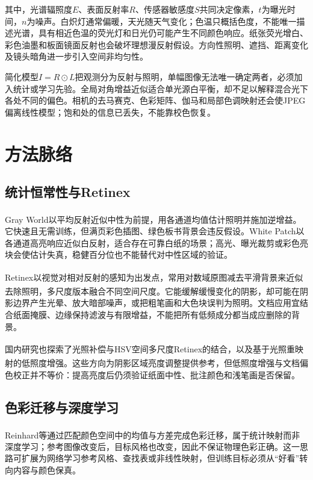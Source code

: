 \documentclass[UTF8,a4paper,zihao=5,fontset=none]{ctexart}
\begin{document}
其中，光谱辐照度$E$、表面反射率$R$、传感器敏感度$S$共同决定像素，$t$为曝光时间，$n$为噪声。白炽灯通常偏暖，天光随天气变化；色温只概括色度，不能唯一描述光谱，具有相近色温的荧光灯和日光仍可能产生不同颜色响应。纸张荧光增白、彩色油墨和板面镜面反射也会破坏理想漫反射假设。方向性照明、遮挡、距离变化及镜头暗角进一步引入空间非均匀性。


简化模型$I=R\odot L$把观测分为反射与照明，单幅图像无法唯一确定两者，必须加入统计或学习先验。全局对角增益近似适合单光源白平衡，却不足以解释混合光下各处不同的偏色。相机的去马赛克、色彩矩阵、伽马和局部色调映射还会使JPEG偏离线性模型；饱和处的信息已丢失，不能靠校色恢复。


\section{方法脉络}

\subsection{统计恒常性与Retinex}

Gray World以平均反射近似中性为前提，用各通道均值估计照明并施加逆增益\textsuperscript{\cite{buchsbaum1980}}。它快速且无需训练，但满页彩色插图、绿色板书背景会违反假设。White Patch以各通道高亮响应近似白反射，适合存在可靠白纸的场景；高光、曝光裁剪或彩色亮块会使估计失真，稳健百分位也不能替代对中性区域的验证。


Retinex以视觉对相对反射的感知为出发点\textsuperscript{\cite{land1971}}，常用对数域原图减去平滑背景来近似去除照明，多尺度版本融合不同空间尺度\textsuperscript{\cite{jobson1997}}。它能缓解缓慢变化的阴影，却可能在阴影边界产生光晕、放大暗部噪声，或把粗笔画和大色块误判为照明。文档应用宜结合纸面掩膜、边缘保持滤波与有限增益，不能把所有低频成分都当成应删除的背景。


国内研究也探索了光照补偿与HSV空间多尺度Retinex的结合\textsuperscript{\cite{wang2022retinex}}，以及基于光照重映射的低照度增强\textsuperscript{\cite{jia2021illumination}}。这些方向为阴影区域亮度调整提供参考，但低照度增强与文档偏色校正并不等价：提高亮度后仍须验证纸面中性、批注颜色和浅笔画是否保留。


\subsection{色彩迁移与深度学习}

Reinhard等通过匹配颜色空间中的均值与方差完成色彩迁移\textsuperscript{\cite{reinhard2001}}，属于统计映射而非深度学习；参考图像改变后，目标风格也改变，因此不保证物理色彩正确。这一思路可扩展为网络学习参考风格、查找表或非线性映射，但训练目标必须从“好看”转向内容与颜色保真。
\end{document}
